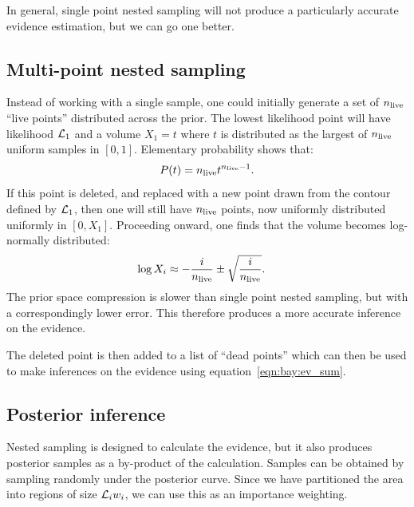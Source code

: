 In general, single point nested sampling will not produce a particularly accurate evidence estimation, but we can go one better.


\subsection{Multi-point nested sampling}
Instead of working with a single sample, one could initially generate a set of \(n_{\mathrm{live}}\) ``live points'' distributed across the prior. The lowest likelihood point will have likelihood \(\mathcal{L}_1\) and a volume \(X_1 = t\) where \(t\) is distributed as the largest of \(n_{\mathrm{live}}\) uniform samples in \([0,1]\). Elementary probability shows that:
\begin{equation}
  P(t) = n_{\mathrm{live}} t^{n_{\mathrm{live}}-1}.
  \label{eqn:bay:t_prob}
\end{equation}
If this point is deleted, and replaced with a new point drawn from the contour defined by \(\mathcal{L}_1\), then one will still have \(n_{\mathrm{live}}\) points, now uniformly distributed uniformly in \([0,X_1]\). Proceeding onward, one finds that the volume becomes log-normally distributed:
\begin{align}
  \log X_i  &\approx -\frac{i}{n_{\mathrm{live}}} \pm \sqrt{\frac{i}{n_{\mathrm{live}}}}.
  \label{eqn:pc:X_full}
\end{align}
The prior space compression is slower than single point nested sampling, but with a correspondingly lower error. This therefore produces a more accurate inference on the evidence.

The deleted point is then added to a list of ``dead points'' which can then be used to make inferences on the evidence using equation~\eqref{eqn:bay:ev_sum}.


\subsection{Posterior inference}
Nested sampling is designed to calculate the evidence, but it also produces posterior samples as a by-product of the calculation. Samples can be obtained by sampling randomly under the posterior curve.%
Since we have partitioned the area into regions of size \(\mathcal{L}_i w_i\), we can use this as an importance weighting.


